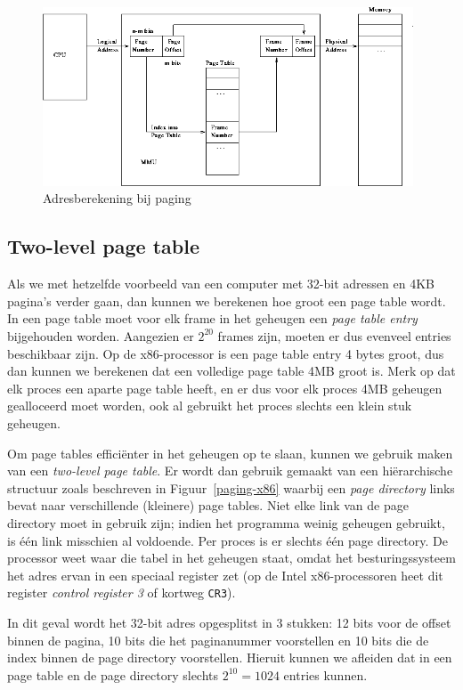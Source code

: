 \begin{figure}
\begin{center}
\includegraphics[width=110mm]{images/paging_hardware.png}
\end{center}
\caption{Adresberekening bij paging}
\label{paging}
\end{figure}

\subsection{Two-level page table}

Als we met hetzelfde voorbeeld van een computer met 32-bit adressen en 4KB pagina's verder gaan, dan kunnen we berekenen hoe groot een page table wordt. In een page table moet voor elk frame in het geheugen een \emph{page table entry} bijgehouden worden. Aangezien er $2^{20}$ frames zijn, moeten er dus evenveel entries beschikbaar zijn. Op de x86-processor is een page table entry 4 bytes groot, dus dan kunnen we berekenen dat een volledige page table 4MB groot is. Merk op dat elk proces een aparte page table heeft, en er dus voor elk proces 4MB geheugen gealloceerd moet worden, ook al gebruikt het proces slechts een klein stuk geheugen.

Om page tables effici\"enter in het geheugen op te slaan, kunnen we gebruik maken van een \emph{two-level page table}. Er wordt dan gebruik gemaakt van een hi\"erarchische structuur zoals beschreven in Figuur~\ref{paging-x86} waarbij een \emph{page directory} links bevat naar verschillende (kleinere) page tables. Niet elke link van de page directory moet in gebruik zijn; indien het programma weinig geheugen gebruikt, is \'e\'en link misschien al voldoende. Per proces is er slechts \'e\'en page directory. De processor weet waar die tabel in het geheugen staat, omdat het besturingssysteem het adres ervan in een speciaal register zet (op de Intel x86-processoren heet dit register \emph{control register 3} of kortweg \texttt{CR3}).

In dit geval wordt het 32-bit adres opgesplitst in 3 stukken: 12 bits voor de offset binnen de pagina, 10 bits die het paginanummer voorstellen en 10 bits die de index binnen de page directory voorstellen. Hieruit kunnen we afleiden dat in een page table en de page directory slechts $2^{10} = 1024$ entries kunnen.

